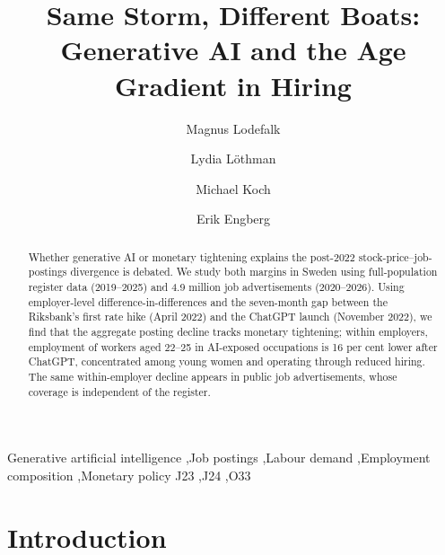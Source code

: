 \documentclass[preprint,12pt,authoryear]{elsarticle}
\begin{document}
\begin{frontmatter}

\title{Same Storm, Different Boats: Generative AI and the Age Gradient in Hiring}

\author[oru,ratio]{Magnus Lodefalk}
\author[oru]{Lydia L\"othman}
\author[au,kiel]{Michael Koch}
\author[oru,ratio]{Erik Engberg}

\address[oru]{\"Orebro University School of Business, SE-701 82 \"Orebro, Sweden}
\address[ratio]{RATIO Institute, Stockholm, Sweden}
\address[au]{Department of Economics and Business Economics, Aarhus University, Denmark}
\address[kiel]{Kiel Institut f\"ur Weltwirtschaft, Germany}

\begin{abstract}
Whether generative AI or monetary tightening explains the post-2022 stock-price--job-postings divergence is debated. We study both margins in Sweden using full-population register data (2019--2025) and 4.9 million job advertisements (2020--2026). Using employer-level difference-in-differences and the seven-month gap between the Riksbank's first rate hike (April 2022) and the ChatGPT launch (November 2022), we find that the aggregate posting decline tracks monetary tightening; within employers, employment of workers aged 22--25 in AI-exposed occupations is 16 per cent lower after ChatGPT, concentrated among young women and operating through reduced hiring. The same within-employer decline appears in public job advertisements, whose coverage is independent of the register.
\end{abstract}

\begin{keyword}
Generative artificial intelligence \sep Job postings \sep Labour demand \sep Employment composition \sep Monetary policy
\JEL J23 \sep J24 \sep O33
\end{keyword}

\end{frontmatter}

\section{Introduction}
\end{document}
